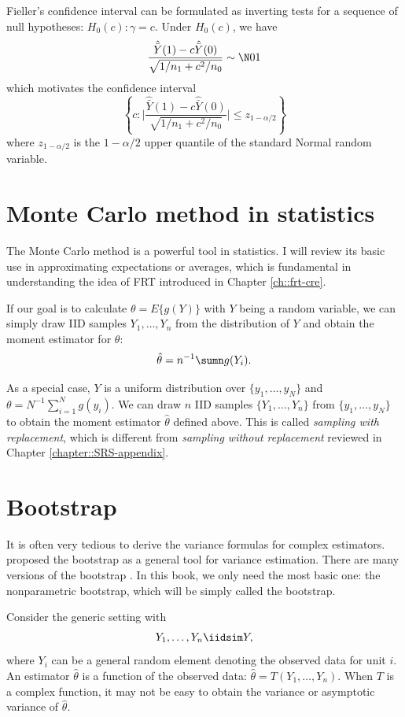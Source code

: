 Fieller's confidence interval can be formulated as inverting tests for a sequence of null hypotheses: $H_0(c): \gamma = c$. Under $H_0(c)$, we have 
$$
\frac{  \hat{\bar{Y}}(1)  - c \hat{\bar{Y}}(0) }{  \sqrt{ 1/n_1 + c^2/n_0  } } \sim \N01 
$$
which motivates the confidence interval
$$
\left\{
c: \Big | \frac{  \hat{\bar{Y}}(1)  - c \hat{\bar{Y}}(0) }{  \sqrt{ 1/n_1 + c^2/n_0  } } \Big | \leq z_{1-\alpha/2}
\right\}
$$
where $z_{1-\alpha/2}$ is the $1-\alpha/2$ upper quantile of the standard Normal random variable.


\section{Monte Carlo method in statistics}\label{sec::monte-carlo-method}


The Monte Carlo method is a powerful tool in statistics. I will review its basic use in approximating expectations or averages, which is fundamental in understanding the idea of FRT  introduced in Chapter \ref{ch::frt-cre}. 


If our goal is to calculate $\theta = E\{  g(Y)\}$ with $Y$ being a random variable, we can simply draw IID samples $Y_1,\ldots, Y_n$ from the distribution of $Y$ and obtain the moment estimator for $\theta$:
$$
\hat\theta = n^{-1} \sumn g(Y_i).
$$

As a special case, $Y$ is a uniform distribution over $\{ y_1, \ldots, y_N \}$ and $\theta = N^{-1} \sum_{i=1}^N g(y_i)$. We can draw $n$ IID samples $\{ Y_1, \ldots, Y_n \}$ from $\{ y_1, \ldots, y_N \}$ to obtain the moment estimator $\hat\theta $ defined above. This is called {\it sampling with replacement}, which is different from {\it sampling without replacement} reviewed in Chapter \ref{chapter::SRS-appendix}. 



\section{Bootstrap}
\label{sec::bootstrap}


 
It is often very tedious to derive the variance formulas for complex estimators. \citet{Efron_1979} proposed the bootstrap as a general tool for variance estimation.  There are many versions of the bootstrap \citep{davison1997bootstrap}. In this book, we only need the most basic one: the nonparametric bootstrap, which will be simply called the bootstrap. 


Consider the generic setting with 
$$
Y_1,\ldots, Y_n \iidsim Y,
$$
where $Y_i$ can be a general random element denoting the observed data for unit $i$. An estimator $\hat\theta$ is a function of the observed data: $\hat\theta = T(Y_1, \ldots, Y_n)$. When $T$ is a complex function, it may not be easy to obtain the variance or asymptotic variance of $\hat\theta$. 

